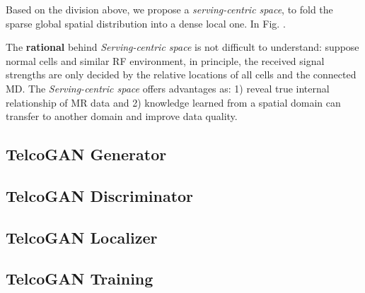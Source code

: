 Based on the division above, we propose a \emph{serving-centric space}, to fold the sparse global spatial distribution into a dense local one. In Fig. .

The \textbf{rational} behind \emph{Serving-centric space} is not difficult to understand: suppose normal cells and similar RF environment, in principle, the received signal strengths are only decided by the relative locations of all cells and the connected MD. The \emph{Serving-centric space} offers advantages as: 1) reveal true internal relationship of MR data and 2) knowledge learned from a spatial domain can transfer to another domain and improve data quality.

\subsection{TelcoGAN Generator}

\subsection{TelcoGAN Discriminator}

\subsection{TelcoGAN Localizer}

\subsection{TelcoGAN Training}
